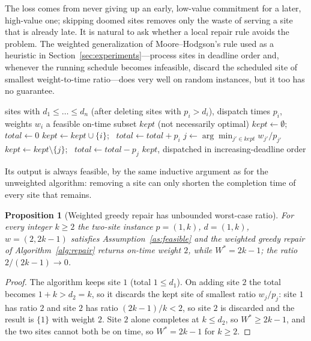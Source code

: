 \documentclass[pdflatex,sn-mathphys-ay]{sn-jnl}
\theoremstyle{thmstyleone}
\newtheorem{proposition}[theorem]{Proposition}
\theoremstyle{thmstyletwo}
\theoremstyle{thmstylethree}
\begin{document}
The loss comes from never giving up an early, low-value commitment for a
later, high-value one; skipping doomed sites removes only the waste of
serving a site that is already late. It is natural to ask whether a
local repair rule avoids the problem. The weighted generalization of
Moore--Hodgson's rule used as a heuristic in
Section~\ref{sec:experiments}---process sites in deadline order and,
whenever the running schedule becomes infeasible, discard the scheduled
site of smallest weight-to-time ratio---does very well on random
instances, but it too has no guarantee.

\begin{algorithm}
\caption{Weighted greedy repair (heuristic; no guarantee)}\label{alg:repair}
\begin{algorithmic}[1]
\Require sites with $d_1\le\dots\le d_n$ (after deleting sites with $p_i>d_i$), dispatch times $p_i$, weights $w_i$
\Ensure a feasible on-time subset $\mathit{kept}$ (not necessarily optimal)
\State $\mathit{kept} \gets \emptyset$; \ $\mathit{total} \gets 0$
  \State $\mathit{kept} \gets \mathit{kept} \cup \{i\}$; \ $\mathit{total} \gets \mathit{total} + p_i$
    \State $j \gets \arg\min_{j' \in \mathit{kept}} w_{j'}/p_{j'}$ 
    \State $\mathit{kept} \gets \mathit{kept} \setminus \{j\}$; \ $\mathit{total} \gets \mathit{total} - p_j$
  \EndWhile
\EndFor
\State \Return $\mathit{kept}$, dispatched in increasing-deadline order
\end{algorithmic}
\end{algorithm}

Its output is always feasible, by the same inductive argument as for the
unweighted algorithm: removing a site can only shorten the completion
time of every site that remains.

\begin{proposition}[Weighted greedy repair has unbounded worst-case ratio]\label{prop:repair}
For every integer $k\ge2$ the two-site instance $p=(1,k)$, $d=(1,k)$,
$w=(2,2k-1)$ satisfies Assumption~\ref{as:feasible} and the weighted
greedy repair of Algorithm~\ref{alg:repair} returns on-time weight $2$,
while $W^\ast=2k-1$; the ratio $2/(2k-1)\to0$.
\end{proposition}

\begin{proof}
The algorithm keeps site $1$ (total $1\le d_1$). On adding site $2$ the
total becomes $1+k>d_2=k$, so it discards the kept site of smallest
ratio $w_j/p_j$: site $1$ has ratio $2$ and site $2$ has ratio
$(2k-1)/k<2$, so site $2$ is discarded and the result is $\{1\}$ with
weight $2$. Site $2$ alone completes at $k\le d_2$, so $W^\ast\ge2k-1$,
and the two sites cannot both be on time, so $W^\ast=2k-1$ for $k\ge2$.
\end{proof}
\end{document}
